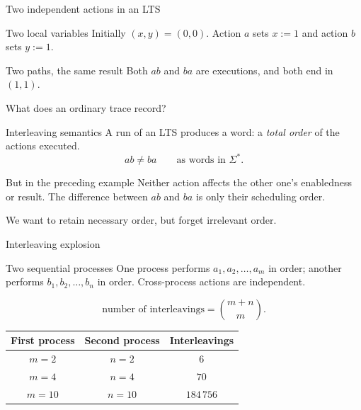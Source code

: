 \documentclass[t,11pt]{beamer}
\begin{document}
\begin{frame}{Two independent actions in an LTS}
  \begin{block}{Two local variables}
    Initially $(x,y)=(0,0)$. Action $a$ sets $x:=1$ and action $b$ sets $y:=1$.
  \end{block}
  \vspace{0.1cm}
  \begin{center}
  \end{center}
  \begin{block}{Two paths, the same result}
    Both $ab$ and $ba$ are executions, and both end in $(1,1)$.
  \end{block}
\end{frame}

\begin{frame}{What does an ordinary trace record?}
  \begin{block}{Interleaving semantics}
    A run of an LTS produces a word: a \emph{total order} of the actions executed.
    \[
      ab\neq ba \qquad \text{as words in }\Sigma^*.
    \]
  \end{block}
  \begin{block}{But in the preceding example}
    Neither action affects the other one's enabledness or result. The difference between $ab$ and $ba$ is only their scheduling order.
  \end{block}
  \vspace{0.12cm}
  \centering\large We want to retain necessary order, but forget irrelevant order.
\end{frame}

\begin{frame}{Interleaving explosion}
  \begin{block}{Two sequential processes}
    One process performs $a_1,a_2,\ldots,a_m$ in order; another performs $b_1,b_2,\ldots,b_n$ in order. Cross-process actions are independent.
  \end{block}
  \[
    \text{number of interleavings}=\binom{m+n}{m}.
  \]
  \begin{center}
  \begin{tabular}{c|c|c}
  First process & Second process & Interleavings\\ \hline
  $m=2$ & $n=2$ & $6$\\
  $m=4$ & $n=4$ & $70$\\
  $m=10$ & $n=10$ & $184\,756$
  \end{tabular}
  \end{center}
\end{frame}
\end{document}
